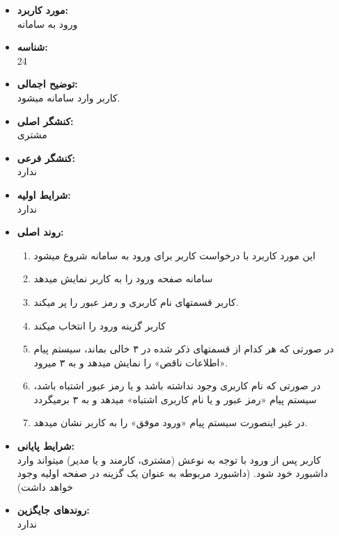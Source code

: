 \documentclass{article}
\begin{document}
\begin{itemize}
\item \textbf{مورد کاربرد:}\\
ورود به سامانه
\item \textbf{شناسه:}\\
24
\item \textbf{توضیح اجمالی:}\\
کاربر وارد سامانه میشود.
\item \textbf{کنشگر اصلی:}\\
مشتری
\item \textbf{کنشگر فرعی:}\\
ندارد
\item \textbf{شرایط اولیه:}\\
ندارد
\item \textbf{روند اصلی:}\\
\begin{enumerate}
\item  این مورد کاربرد با درخواست کاربر برای ورود به سامانه شروع میشود
\item سامانه صفحه ورود را به کاربر نمایش میدهد
\item کاربر قسمتهای نام کاربری و رمز عبور را پر میکند.
\item کاربر گزینه ورود را انتخاب میکند
\item در صورتی که هر کدام از قسمتهای ذکر شده در ۳ خالی بماند، سیستم پیام «اطلاعات ناقص» را نمایش میدهد و به ۳ میرود.
\item  در صورتی که نام کاربری وجود نداشته باشد و یا رمز عبور اشتباه باشد، سیستم پیام «رمز عبور و یا نام کاربری اشتباه» میدهد و به ۳ برمیگردد
\item در غیر اینصورت سیستم پیام «ورود موفق» را به کاربر نشان میدهد.
\end{enumerate}
\item \textbf{شرایط پایانی:}\\ 
کاربر پس از ورود با توجه به نوعش (مشتری، کارمند و یا مدیر) میتواند وارد داشبورد خود شود. (داشبورد مربوطه به عنوان یک گزینه در صفحه اولیه وجود خواهد داشت)
\item \textbf{روندهای جایگزین:}\\
ندارد
\end{itemize}
\noindent\makebox[\linewidth]{\rule{\paperwidth}{0.4pt}}
\end{document}
